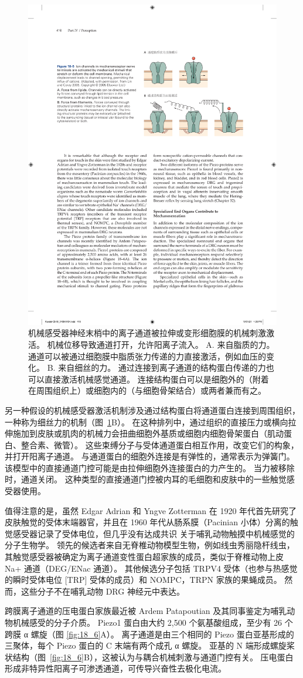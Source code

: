 \begin{figure}[htbp]
	\centering
	\includegraphics[width=0.5\linewidth]{chap18/fig_18_5}
	\caption{机械感受器神经末梢中的离子通道被拉伸或变形细胞膜的机械刺激激活。 
		机械位移导致通道打开，允许阳离子流入\cite{lin2005trp}。
		A. 来自脂质的力。
		通道可以被通过细胞膜中脂质张力传递的力直接激活，例如血压的变化。
		B. 来自细丝的力。
		通过连接到离子通道的结构蛋白传递的力也可以直接激活机械感觉通道。
		连接结构蛋白可以是细胞外的（附着在周围组织上）或细胞内的（与细胞骨架结合）或两者兼而有之。}
	\label{fig:18_5}
\end{figure}

另一种假设的机械感受器激活机制涉及通过结构蛋白将通道蛋白连接到周围组织，一种称为细丝力的机制（图~\ref{fig:18_5}B）。
在这种排列中，通过组织的直接压力或横向拉伸施加到皮肤或肌肉的机械力会扭曲细胞外基质或细胞内细胞骨架蛋白（肌动蛋白、整合素、微管）。
这些束缚分子与受体通道蛋白相互作用，改变它们的构象，并打开阳离子通道。
与通道蛋白的细胞外连接是有弹性的，通常表示为弹簧门。
该模型中的直接通道门控可能是由拉伸细胞外连接蛋白的力产生的。
当力被移除时，通道关闭。
这种类型的直接通道门控被内耳的毛细胞和皮肤中的一些触觉感受器使用。


值得注意的是，虽然 Edgar Adrian 和 Yngve Zotterman 在 1920 年代首先研究了皮肤触觉的受体末端器官，并且在 1960 年代从肠系膜（Pacinian 小体）分离的触觉感受器记录了受体电位，但几乎没有达成共识 关于哺乳动物触摸中机械感觉的分子生物学。
领先的候选者来自无脊椎动物模型生物，例如线虫秀丽隐杆线虫，其触觉感受器被确定为离子通道变性蛋白超家族的成员，类似于脊椎动物上皮 Na+ 通道（DEG/ENac 通道）。
其他候选分子包括 TRPV4 受体（也参与热感觉的瞬时受体电位 [TRP] 受体的成员）和 NOMPC，TRPN 家族的果蝇成员。
然而，这些分子不在哺乳动物 DRG 神经元中表达。


跨膜离子通道的压电蛋白家族最近被 Ardem Patapoutian 及其同事鉴定为哺乳动物机械感受的分子介质。
Piezo1 蛋白由大约 2,500 个氨基酸组成，至少有 26 个跨膜 α 螺旋（图 \ref{fig:18_6}A）。
离子通道是由三个相同的 Piezo 蛋白亚基形成的三聚体，每个 Piezo 蛋白的 C 末端有两个成孔 α 螺旋。
亚基的 N 端形成螺旋桨状结构（图~\ref{fig:18_6}B），这被认为与耦合机械刺激与通道门控有关。
压电蛋白形成非特异性阳离子可渗透通道，可传导兴奋性去极化电流。


